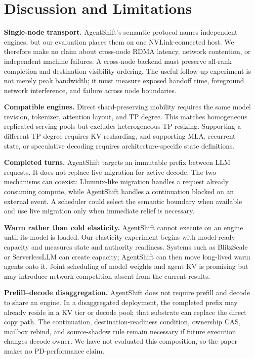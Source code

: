 \section{Discussion and Limitations}\label{discussion-and-limitations}

\textbf{Single-node transport.} AgentShift's semantic protocol names independent engines, but our evaluation places them on one NVLink-connected host. We therefore make no claim about cross-node RDMA latency, network contention, or independent machine failures. A cross-node backend must preserve all-rank completion and destination visibility ordering. The useful follow-up experiment is not merely peak bandwidth; it must measure exposed handoff time, foreground network interference, and failure across node boundaries.

\textbf{Compatible engines.} Direct shard-preserving mobility requires the same model revision, tokenizer, attention layout, and TP degree. This matches homogeneous replicated serving pools but excludes heterogeneous TP resizing. Supporting a different TP degree requires KV resharding, and supporting MLA, recurrent state, or speculative decoding requires architecture-specific state definitions.

\textbf{Completed turns.} AgentShift targets an immutable prefix between LLM requests. It does not replace live migration for active decode. The two mechanisms can coexist: Llumnix-like migration handles a request already consuming compute, while AgentShift handles a continuation blocked on an external event. A scheduler could select the semantic boundary when available and use live migration only when immediate relief is necessary.

\textbf{Warm rather than cold elasticity.} AgentShift cannot execute on an engine until its model is loaded. Our elasticity experiment begins with model-ready capacity and measures state and authority readiness. Systems such as BlitzScale or ServerlessLLM can create capacity; AgentShift can then move long-lived warm agents onto it. Joint scheduling of model weights and agent KV is promising but may introduce network competition absent from the current results.

\textbf{Prefill--decode disaggregation.} AgentShift does not require prefill and decode to share an engine. In a disaggregated deployment, the completed prefix may already reside in a KV tier or decode pool; that substrate can replace the direct copy path. The continuation, destination-readiness condition, ownership CAS, mailbox rebind, and source-shadow rule remain necessary if future execution changes decode owner. We have not evaluated this composition, so the paper makes no PD-performance claim.

